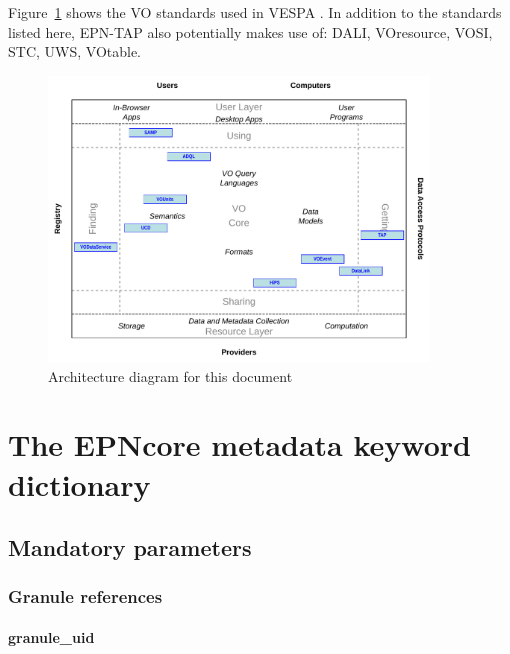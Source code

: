 \documentclass[11pt,a4paper]{ivoa}
\begin{document}
Figure~\ref{fig:archdiag} shows the VO standards used in VESPA \citep{note:VOARCH}.
In addition to the standards listed here, EPN-TAP also potentially makes use of: DALI, VOresource, VOSI, STC, UWS, VOtable. 



\begin{figure}[thb]
\centering

\includegraphics[width=0.9\textwidth]{role_diagram.pdf}
\caption{Architecture diagram for this document}
\label{fig:archdiag}
\end{figure}

\clearpage %

\section{The EPNcore metadata keyword dictionary} 

\subsection{Mandatory parameters}

\subsubsection{Granule references}

\paragraph{granule\_uid}
\end{document}
